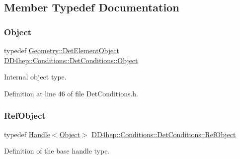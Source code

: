 \subsection{Member Typedef Documentation}
\hypertarget{class_d_d4hep_1_1_conditions_1_1_det_conditions_a4c0ad456b1967b5b724894f23ef63dec}{}\label{class_d_d4hep_1_1_conditions_1_1_det_conditions_a4c0ad456b1967b5b724894f23ef63dec} 
\subsubsection{\texorpdfstring{Object}{Object}}
{\footnotesize\ttfamily typedef \hyperlink{class_d_d4hep_1_1_geometry_1_1_det_element_object}{Geometry\+::\+Det\+Element\+Object} \hyperlink{class_d_d4hep_1_1_conditions_1_1_det_conditions_a4c0ad456b1967b5b724894f23ef63dec}{D\+D4hep\+::\+Conditions\+::\+Det\+Conditions\+::\+Object}}



Internal object type. 



Definition at line 46 of file Det\+Conditions.\+h.

\hypertarget{class_d_d4hep_1_1_conditions_1_1_det_conditions_ab958ffc02b500f3404f001bec0eca780}{}\label{class_d_d4hep_1_1_conditions_1_1_det_conditions_ab958ffc02b500f3404f001bec0eca780} 
\subsubsection{\texorpdfstring{Ref\+Object}{RefObject}}
{\footnotesize\ttfamily typedef \hyperlink{class_d_d4hep_1_1_handle}{Handle}$<$\hyperlink{class_d_d4hep_1_1_conditions_1_1_det_conditions_a4c0ad456b1967b5b724894f23ef63dec}{Object}$>$ \hyperlink{class_d_d4hep_1_1_conditions_1_1_det_conditions_ab958ffc02b500f3404f001bec0eca780}{D\+D4hep\+::\+Conditions\+::\+Det\+Conditions\+::\+Ref\+Object}}



Definition of the base handle type. 



